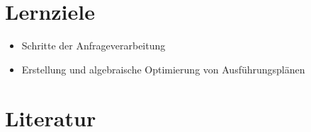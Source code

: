 \section*{Lernziele}

\begin{itemize}
	\item Schritte der Anfrageverarbeitung
	\item Erstellung und algebraische Optimierung von Ausführungsplänen
\end{itemize}

\section*{Literatur}



